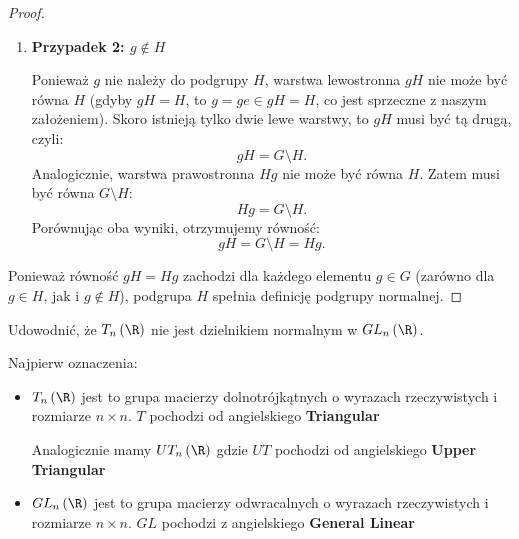\begin{solution}
\begin{proof}
\begin{enumerate}
        Wtedy, z własności podgrupy (zamkniętość na działanie), warstwa lewostronna $gH$ jest równa $H$. Podobnie, warstwa prawostronna $Hg$ jest równa $H$.
        Zatem w tym przypadku zachodzi równość:
        \[
            gH = H = Hg.
        \]

    \item \textbf{Przypadek 2: $g \notin H$}
    
        Ponieważ $g$ nie należy do podgrupy $H$, warstwa lewostronna $gH$ nie może być równa $H$ (gdyby $gH=H$, to $g = ge \in gH = H$, co jest sprzeczne z naszym założeniem). Skoro istnieją tylko dwie lewe warstwy, to $gH$ musi być tą drugą, czyli:
        \[
            gH = G \setminus H.
        \]
        Analogicznie, warstwa prawostronna $Hg$ nie może być równa $H$. Zatem musi być równa $G \setminus H$:
        \[
            Hg = G \setminus H.
        \]
        Porównując oba wyniki, otrzymujemy równość:
        \[
            gH = G \setminus H = Hg.
        \]
\end{enumerate}

Ponieważ równość $gH = Hg$ zachodzi dla każdego elementu $g \in G$ (zarówno dla $g \in H$, jak i $g \notin H$), podgrupa $H$ spełnia definicję podgrupy normalnej.
\end{proof}

\end{solution}
\begin{problem}[5]

	Udowodnić, że $T_{n}\left( \R \right) $ nie jest dzielnikiem normalnym w $GL_{n}\left( \R \right) $.
\end{problem}

	Najpierw oznaczenia:
	\begin{itemize}
		\item $T_{n}\left( \R \right)$ jest to grupa macierzy dolnotrójkątnych o wyrazach rzeczywistych i rozmiarze $n\times n$. $T$ pochodzi od angielskiego \textbf{Triangular} 

			Analogicznie mamy $UT_{n}\left( \R \right)$ gdzie $UT$ pochodzi od angielskiego \textbf{Upper Triangular} 
		\item $GL_{n}\left( \R \right) $ jest to grupa macierzy odwracalnych o wyrazach rzeczywistych i rozmiarze $n\times n$. $GL$ pochodzi z angielskiego  \textbf{General Linear} 
	\end{itemize} 

